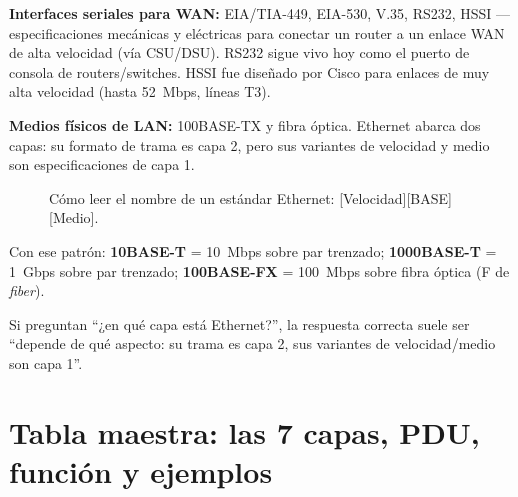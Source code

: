 \documentclass[11pt,a4paper]{article}
\begin{document}
\textbf{Interfaces seriales para WAN:} EIA/TIA-449, EIA-530, V.35, RS232, HSSI --- especificaciones mecánicas y eléctricas para conectar un router a un enlace WAN de alta velocidad (vía CSU/DSU). RS232 sigue vivo hoy como el puerto de consola de routers/switches. HSSI fue diseñado por Cisco para enlaces de muy alta velocidad (hasta 52~Mbps, líneas T3).

\textbf{Medios físicos de LAN:} 100BASE-TX y fibra óptica. Ethernet abarca dos capas: su formato de trama es capa 2, pero sus variantes de velocidad y medio son especificaciones de capa 1.

\begin{figure}[h]
\centering
{}
\caption{Cómo leer el nombre de un estándar Ethernet: [Velocidad][BASE][Medio].}
\end{figure}

Con ese patrón: \textbf{10BASE-T} = 10~Mbps sobre par trenzado; \textbf{1000BASE-T} = 1~Gbps sobre par trenzado; \textbf{100BASE-FX} = 100~Mbps sobre fibra óptica (F de \textit{fiber}).

\begin{examfact}
Si preguntan ``¿en qué capa está Ethernet?'', la respuesta correcta suele ser ``depende de qué aspecto: su trama es capa 2, sus variantes de velocidad/medio son capa 1''.
\end{examfact}

\newpage
\section{Tabla maestra: las 7 capas, PDU, función y ejemplos}
\end{document}
